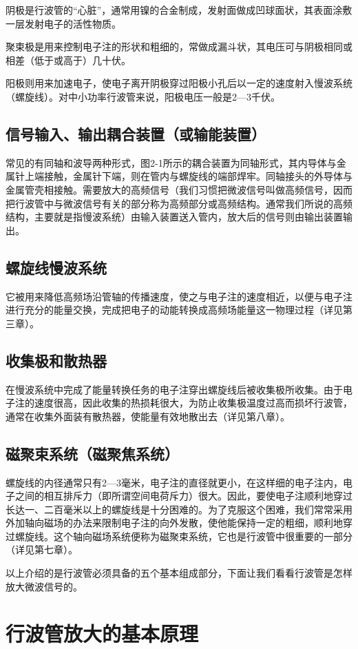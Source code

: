 阴极是行波管的“心脏”，通常用镍的合金制成，发射面做成凹球面状，其表面涂敷一层发射电子的活性物质。

聚束极是用来控制电子注的形状和粗细的，常做成漏斗状，其电压可与阴极相同或相差（低于或高于）几十伏。

阳极则用来加速电子，使电子离开阴极穿过阳极小孔后以一定的速度射入慢波系统（螺旋线）。对中小功率行波管来说，阳极电压一般是2—3千伏。
\subsection{信号输入、输出耦合装置（或输能装置）}
常见的有同轴和波导两种形式，图2-1所示的耦合装置为同轴形式，其内导体与金属针上端接触，金属针下端，则在管内与螺旋线的端部焊牢。同轴接头的外导体与金属管壳相接触。需要放大的高频信号（我们习惯把微波信号叫做高频信号，因而把行波管中与微波信号有关的部分称为高频部分或高频结构。通常我们所说的高频结构，主要就是指慢波系统）由输入装置送入管内，放大后的信号则由输出装置输出。
\subsection{螺旋线慢波系统}
它被用来降低高频场沿管轴的传播速度，使之与电子注的速度相近，以便与电子注进行充分的能量交换，完成把电子的动能转换成高频场能量这一物理过程（详见第三章）。
\subsection{收集极和散热器}
在慢波系统中完成了能量转换任务的电子注穿出螺旋线后被收集极所收集。由于电子注的速度很高，因此收集的热损耗很大，为防止收集极温度过高而损坏行波管，通常在收集外面装有散热器，使能量有效地散出去（详见第八章）。
\subsection{磁聚束系统（磁聚焦系统）}
螺旋线的内径通常只有2—3毫米，电子注的直径就更小，在这样细的电子注内，电子之间的相互排斥力（即所谓空间电荷斥力）很大。因此，要使电子注顺利地穿过长达一、二百毫米以上的螺旋线是十分困难的。为了克服这个困难，我们常常采用外加轴向磁场的办法来限制电子注的向外发散，使他能保持一定的粗细，顺利地穿过螺旋线。这个轴向磁场系统便称为磁聚束系统，它也是行波管中很重要的一部分（详见第七章）。

以上介绍的是行波管必须具备的五个基本组成部分，下面让我们看看行波管是怎样放大微波信号的。
\section{行波管放大的基本原理}
